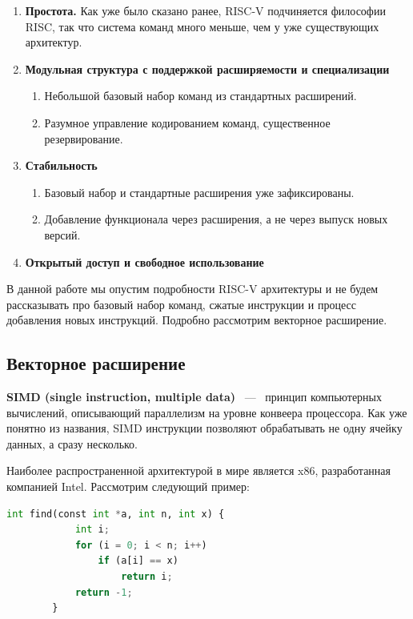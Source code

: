 \documentclass[a4paper, 12pt]{article}
\begin{document}
    \begin{enumerate}
        \item \textbf{Простота.} Как уже было сказано ранее, RISC-V подчиняется философии RISC, так что
        система команд много меньше, чем у уже существующих архитектур.
        \item \textbf{Модульная структура с поддержкой расширяемости и специализации}
        \begin{enumerate}
            \item Небольшой базовый набор команд из стандартных расширений.
            \item Разумное управление кодированием команд, существенное резервирование.
        \end{enumerate}
        \item \textbf{Стабильность}
        \begin{enumerate}
            \item Базовый набор и стандартные расширения уже зафиксированы.
            \item Добавление функционала через расширения, а не через выпуск новых версий.
        \end{enumerate}
        \item \textbf{Открытый доступ и свободное использование}
    \end{enumerate}

    В данной работе мы опустим подробности RISC-V архитектуры и не будем рассказывать про базовый набор
    команд, сжатые инструкции и процесс добавления новых инструкций. Подробно рассмотрим векторное
    расширение.

    \subsection{Векторное расширение}

    \textbf {SIMD (single instruction, multiple data)} ~---~ принцип компьютерных вычислений, описывающий
    параллелизм на уровне конвеера процессора. Как уже понятно из названия, SIMD инструкции позволяют
    обрабатывать не одну ячейку данных, а сразу несколько.

    Наиболее распространенной архитектурой в мире является x86, разработанная компанией Intel. Рассмотрим
    следующий пример:

    \begin{lstlisting}[language=Python, caption=naive example]
        int find(const int *a, int n, int x) {
            int i;
            for (i = 0; i < n; i++)
                if (a[i] == x)
                    return i;
            return -1;
        }
    \end{lstlisting}
\end{document}
